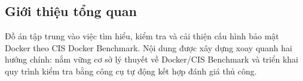 \subsection{Giới thiệu tổng quan}\label{gioi-thieu-tong-quan}

Đồ án tập trung vào việc tìm hiểu, kiểm tra và cải thiện cấu hình bảo mật Docker theo CIS Docker Benchmark. Nội dung được xây dựng xoay quanh hai hướng chính: nắm vững cơ sở lý thuyết về Docker/CIS Benchmark và triển khai quy trình kiểm tra bằng công cụ tự động kết hợp đánh giá thủ công.

